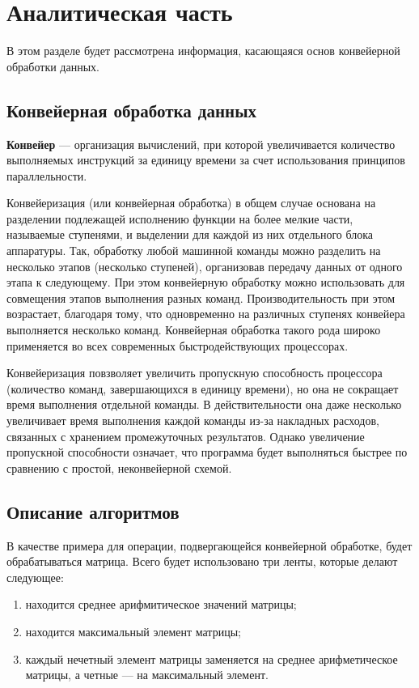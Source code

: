\chapter{Аналитическая часть}
В этом разделе будет рассмотрена информация, касающаяся основ конвейерной обработки данных.

\section{Конвейерная обработка данных}
\textbf{Конвейер} \cite{conway}  --- организация вычислений, при которой увеличивается количество выполняемых инструкций за единицу времени за счет использования принципов параллельности.

Конвейеризация (или конвейерная обработка) в общем случае основана на разделении подлежащей исполнению функции на более мелкие части, называемые ступенями, и выделении для каждой из них отдельного блока аппаратуры. 
Так, обработку любой машинной команды можно разделить на несколько этапов (несколько ступеней), организовав передачу данных от одного этапа к следующему. 
При этом конвейерную обработку можно использовать для совмещения этапов выполнения разных команд. 
Производительность при этом возрастает, благодаря тому, что одновременно на различных ступенях конвейера выполняется несколько команд. 
Конвейерная обработка такого рода широко применяется во всех современных быстродействующих процессорах.


Конвейеризация повзволяет увеличить пропускную способность процессора (количество команд, завершающихся в единицу времени), но она не сокращает время выполнения отдельной команды. 
В действительности она даже несколько увеличивает время выполнения каждой команды из-за накладных расходов, связанных с хранением промежуточных результатов. 
Однако увеличение пропускной способности означает, что программа будет выполняться быстрее по сравнению с простой, неконвейерной схемой.


\section{Описание алгоритмов}

В качестве примера для операции, подвергающейся конвейерной обработке, будет обрабатываться матрица. 
Всего будет использовано три ленты, которые делают следующее:

\begin{enumerate}[label=\arabic*)]
	\item находится среднее арифмитическое значений матрицы;
	\item находится максимальный элемент матрицы;
	\item каждый нечетный элемент матрицы заменяется на среднее арифметическое матрицы, а четные --- на максимальный элемент.
\end{enumerate}



